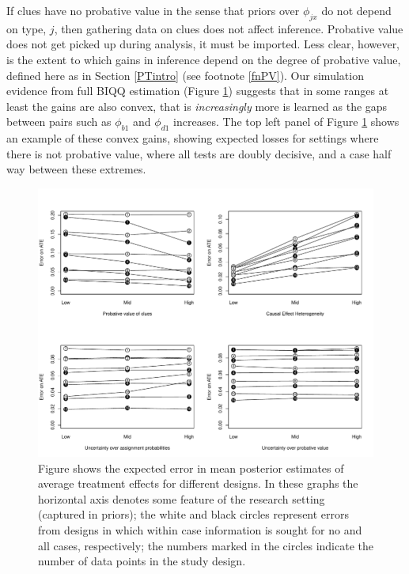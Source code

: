 \documentclass[12pt,]{book}
\begin{document}
If clues have no probative value\textbar{} in the sense that priors over \(\phi_{jx}\) do not depend on type, \(j\), then gathering data on clues does not affect inference. Probative value does not get picked up during analysis, it must be imported. Less clear, however, is the extent to which gains in inference depend on the degree of probative value, defined here as in Section \ref{PTintro} (see footnote \ref{fnPV}). Our simulation evidence from full BIQQ estimation (Figure \ref{experiments}) suggests that in some ranges at least the gains are also convex, that is \emph{increasingly} more is learned as the gaps between pairs such as \(\phi_{b1}\) and \(\phi_{d1}\) increases. The top left panel of Figure \ref{experiments} shows an example of these convex gains, showing expected losses for settings where there is not probative value, where all tests are doubly decisive, and a case half way between these extremes.

\begin{figure}[h!]
\centering
\includegraphics[width=\textwidth]{Figures/experiments.pdf}
\caption{Figure shows the expected error in mean posterior estimates of average treatment effects for different designs. In these graphs the horizontal axis denotes some feature of the research setting (captured in priors); the white and black circles represent errors from designs in which within case information is sought for no and all cases, respectively; the numbers marked in the circles indicate the number of data points in the study design.}
\label{experiments}
\end{figure}
\end{document}

